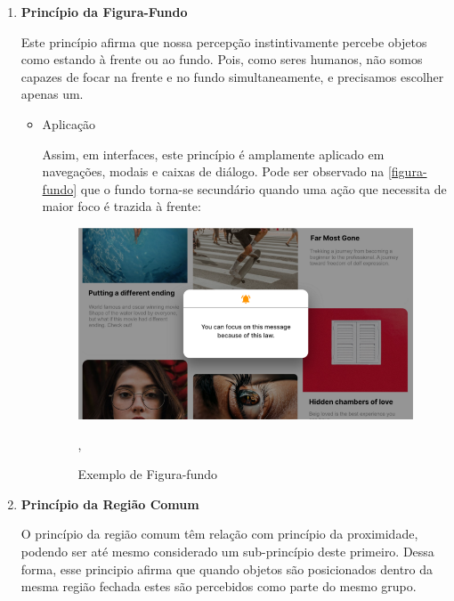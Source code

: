 \begin{enumerate}
    \item \textbf{Princípio da Figura-Fundo}
    
    Este princípio afirma que nossa percepção instintivamente percebe objetos como estando à frente ou ao fundo. Pois, como seres humanos, não somos capazes de focar na frente e no fundo simultaneamente, e precisamos escolher apenas um.
    
    \begin{itemize}
        \item Aplicação
        
        Assim, em interfaces, este princípio é amplamente aplicado em navegações, modais e caixas de diálogo. Pode ser observado na \autoref{figura-fundo} que o fundo torna-se secundário quando uma ação que necessita de maior foco é trazida à frente:
        
        \begin{figure}[htb]
        	\begin{center}
        	    \includegraphics[scale=0.45]{figs/figura-fundo.png}
        	\end{center}
        	\caption{\label{figura-fundo}Exemplo de Figura-fundo},
        \end{figure}
    \end{itemize}
    
    \item \textbf{Princípio da Região Comum}
    
    O princípio da região comum têm relação com princípio da proximidade, podendo ser até mesmo considerado um sub-princípio deste primeiro. Dessa forma, esse principio afirma que quando objetos são posicionados dentro da mesma região fechada estes são percebidos como parte do mesmo grupo.
    

\end{enumerate}
